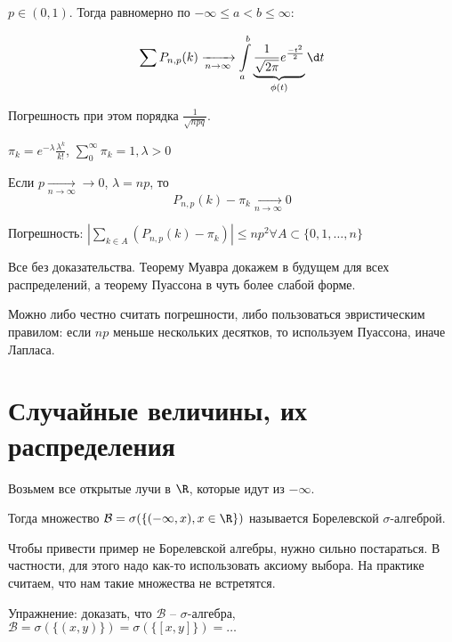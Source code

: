 \begin{theorem}
$p \in (0, 1)$. Тогда равномерно по $-\infty \leq a < b \leq \infty$:

$$\sum P_{n, p}(k) \xrightarrow[n \to \infty]{} \int\limits_a^b \underbrace{\frac{1}{\sqrt{2 \pi}} e^{\frac{-t^2}{2}}}_{\phi(t)} \d t$$

Погрешность при этом порядка $\frac{1}{\sqrt{npq}}$.
\end{theorem}

\begin{theorem}[Пуассон]
$\pi_k = e^{-\lambda} \frac{\lambda^k}{k!}$, $\sum\limits_0^{\infty} \pi_k = 1, \lambda > 0$

Если $p \xrightarrow[n \to \infty]{} \to 0$, $\lambda = np$, то $$P_{n, p}(k) - \pi_k \xrightarrow[n \to \infty]{} 0$$

Погрешность: $|\sum\limits_{k \in A} (P_{n, p}(k) - \pi_k)| \leq np^2 \forall A \subset \{0, 1, \dots, n\}$

\end{theorem}
\begin{Rem}
Все без доказательства. 
Теорему Муавра докажем в будущем для всех распределений, а теорему Пуассона в чуть более слабой форме.
\end{Rem}
\begin{Rem}
Можно либо честно считать погрешности, либо пользоваться эвристическим правилом: если $np$ меньше нескольких десятков, то используем Пуассона, иначе Лапласа.
\end{Rem}

\chapter{Случайные величины, их распределения}
\begin{Def}
Возьмем все открытые лучи в $\R$, которые идут из $-\infty$. 

Тогда множество $\mathcal{B} = \sigma(\{(-\infty, x), x \in \R \})$ называется Борелевской $\sigma$-алгеброй.
\end{Def}                    
\begin{Rem}
Чтобы привести пример не Борелевской алгебры, нужно сильно постараться. 
В частности, для этого надо как-то использовать аксиому выбора. 
На практике считаем, что нам такие множества не встретятся.
\end{Rem}
Упражнение: доказать, что $\mathcal{B}$ -- $\sigma$-алгебра, $\mathcal{B} = \sigma(\{ (x, y) \}) = \sigma(\{[x, y]\}) = \dots$


